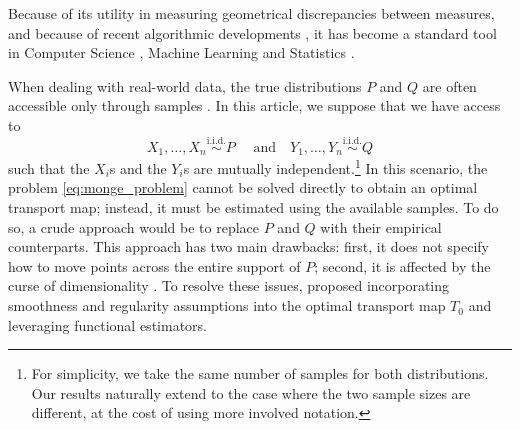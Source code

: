 \documentclass{article}
\theoremstyle{plain}
\theoremstyle{definition}
\theoremstyle{remark}
\newcommand{\iid}{\stackrel{{\text{i.i.d.}}}{\sim}}
\begin{document}
Because of its utility in measuring geometrical discrepancies between measures, and because of recent algorithmic developments \cite{cuturi2013sinkhorn,DBLP:conf/nips/AltschulerWR17,DBLP:conf/icml/DvurechenskyGK18}, it has become a standard tool in Computer Science \cite{DBLP:conf/miccai/FeydyCVP17,DBLP:journals/tog/LavenantCCS18,DBLP:journals/tog/SolomonGPCBNDG15,DBLP:journals/tog/SolomonPKS16}, Machine Learning \cite{DBLP:journals/corr/abs-1811-01124,DBLP:conf/aistats/Alvarez-MelisJJ18,arjovski2017WGAN,DBLP:conf/nips/CanasR12,gordaliza2019obtainingFairness,DBLP:journals/ml/FlamaryCCR18,DBLP:conf/aistats/GenevayPC18,DBLP:conf/aistats/GraveJB19,DBLP:conf/aistats/JanatiCG19,DBLP:conf/nips/MontavonMC16,DBLP:journals/siamis/SchmitzHBMCCPS18,DBLP:conf/nips/StaibCSJ17,DBLP:conf/iclr/LeNSHHX24} and Statistics \cite{del2024central,del2024centralb,DBLP:journals/siamsc/CazellesSBCP18,DBLP:journals/ma/BarrioGLL19,DBLP:journals/simods/KlattTM20,Kroshnin2019StatisticalIF,annurev:/content/journals/10.1146/annurev-statistics-030718-104938,DBLP:journals/entropy/RamdasTC17,RIGOLLET20181228,DBLP:conf/nips/SeguyC15,DBLP:conf/dsw/TamelingM18,DBLP:conf/colt/WeedB19,10.3150/17-BEJ1009}.

When dealing with real-world data, the true distributions $P$ and $Q$ are often accessible only through samples \cite{NIPS2017_0070d23b,DBLP:conf/pkdd/CourtyFT14,courty2017OTDomainAdapt,DBLP:conf/eccv/DamodaranKFTC18,DBLP:conf/aistats/ForrowHNRSW19,DBLP:conf/nips/PerrotCFH16,DBLP:conf/iclr/SeguyDFCRB18,hutter2021minimax}. In this article, we suppose that we have access to \[X_1, \dots, X_n \iid P \quad \text{ and } ~~~  Y_1, \dots, Y_n \iid Q\]
such that the $X_i$s and the $Y_i$s are mutually independent.\footnote{For simplicity, we take the same number of samples for both distributions. Our results naturally extend to the case where the two sample sizes are different, at the cost of using more involved notation.} 
In this scenario, the problem \eqref{eq:monge_problem} cannot be solved directly to obtain an optimal transport map; instead, it must be estimated using the available samples. 
To do so, a crude approach would be to replace $P$ and $Q$ with their empirical counterparts. 
This approach has two main drawbacks: first, it does not specify how to move points across the entire support of $P$; second, it is affected by the curse of dimensionality \cite{10.3150/21-BEJ1433}. To resolve these issues, \cite{hutter2021minimax} proposed incorporating smoothness and regularity assumptions into the optimal transport map 
$T_0$ and leveraging functional estimators. 
\end{document}
